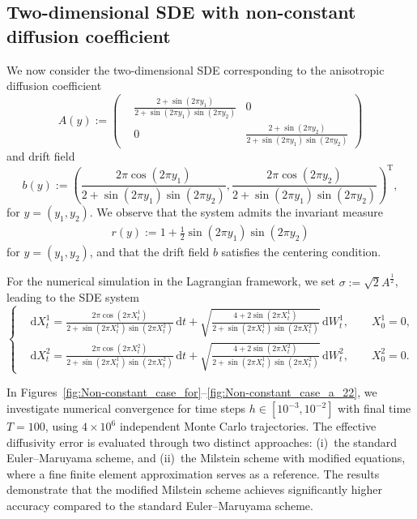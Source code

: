 \documentclass[12pt,a4paper,reqno]{amsart}
\numberwithin{equation}{section}
\begin{document}
\subsection{Two-dimensional SDE with non-constant diffusion coefficient}
We now consider the two-dimensional SDE corresponding to the anisotropic diffusion coefficient 
$$A(y) :=
\begin{pmatrix}
&\frac{2 + \sin(2\pi y_1)}{2 + \sin(2\pi y_1)\sin(2\pi y_2)}  & 0\\
&0 &\frac{2 + \sin(2\pi y_2)}{2 + \sin(2\pi y_1)\sin(2\pi y_2)}
\end{pmatrix}
$$
and drift field
$$
b(y) := \left(\frac{2\pi \cos(2\pi y_1)}{2 + \sin(2\pi y_1)\sin(2\pi y_2)},\frac{2\pi\cos(2\pi y_2)}{2 + \sin(2\pi y_1)\sin(2\pi y_2)}\right)^{\mathrm{T}},
$$
for $y=(y_1,y_2)$. We observe that the system admits the invariant measure 
\begin{align*}
    r(y) := 1 + \frac{1}{2}\sin(2\pi y_1)\sin (2\pi y_2)
\end{align*}
for $y=(y_1,y_2)$, and that the drift field $b$ satisfies the centering condition.

For the numerical simulation in the Lagrangian framework, we set $ \sigma := \sqrt{2} A^{\frac{1}{2}}$, leading to the SDE system 
\begin{equation*}
\left\{
\begin{aligned}
    &\mathrm{d}X_t^1 = \frac{2\pi \cos(2\pi X_t^1)}{2 + \sin(2\pi X_t^1)\sin(2\pi X_t^2)}\,\mathrm{d}t + \sqrt{\frac{4 + 2\sin(2\pi X_t^1)}{2 + \sin(2 \pi X_t^1)\sin(2\pi X_t^2)}}\,\mathrm{d}W_t^1,\qquad X_0^1 = 0,\\
    &\mathrm{d}X_t^2 = \frac{2\pi\cos(2\pi X_t^2)}{2+\sin(2 \pi X_t^1)\sin(2\pi X_t^2)}\,\mathrm{d}t + \sqrt{\frac{4 + 2\sin(2\pi X_t^2)}{2 + \sin(2\pi X_t^1)\sin(2\pi X_t^2)}}\,\mathrm{d}W_t^2,\qquad X_0^2 = 0.
    \end{aligned}
    \right.
\end{equation*}

In Figures~\ref{fig:Non-constant_case_for}--\ref{fig:Non-constant_case_a_22}, we investigate numerical convergence for time steps $h\in [10^{-3},10^{-2}]$ with final time $T=100$, using $4\times10^6$ independent Monte Carlo trajectories. The effective diffusivity error is evaluated through two distinct approaches: (i)~the standard Euler--Maruyama scheme, and (ii)~the Milstein scheme with modified equations, where a fine finite element approximation serves as a reference. The results demonstrate that the modified Milstein scheme achieves significantly higher accuracy compared to the standard Euler--Maruyama scheme.
\end{document}
